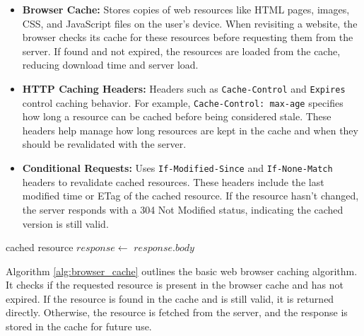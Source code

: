 \documentclass[12pt]{book} %
\begin{document}
\begin{itemize}
    \item \textbf{Browser Cache:} Stores copies of web resources like HTML pages, images, CSS, and JavaScript files on the user's device. When revisiting a website, the browser checks its cache for these resources before requesting them from the server. If found and not expired, the resources are loaded from the cache, reducing download time and server load.
    
    \item \textbf{HTTP Caching Headers:} Headers such as \texttt{Cache-Control} and \texttt{Expires} control caching behavior. For example, \texttt{Cache-Control: max-age} specifies how long a resource can be cached before being considered stale. These headers help manage how long resources are kept in the cache and when they should be revalidated with the server.
    
    \item \textbf{Conditional Requests:} Uses \texttt{If-Modified-Since} and \texttt{If-None-Match} headers to revalidate cached resources. These headers include the last modified time or ETag of the cached resource. If the resource hasn't changed, the server responds with a 304 Not Modified status, indicating the cached version is still valid.
\end{itemize}


\FloatBarrier
\begin{algorithm}[h]
\caption{Web Browser Caching Algorithm}\label{alg:browser_cache}
\begin{algorithmic}[1]
            \State \Return cached resource
        \EndIf
    \EndIf
    \State $response \gets$ 
        \State {}
    \EndIf
    \State \Return $response.body$
\EndFunction
\end{algorithmic}
\end{algorithm}
\FloatBarrier

Algorithm \ref{alg:browser_cache} outlines the basic web browser caching algorithm. It checks if the requested resource is present in the browser cache and has not expired. If the resource is found in the cache and is still valid, it is returned directly. Otherwise, the resource is fetched from the server, and the response is stored in the cache for future use.
\end{document}
